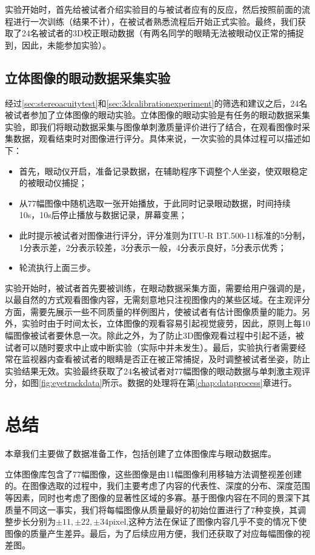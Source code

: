 实验开始时，首先给被试者介绍实验目的与被试者应有的反应，然后按照前面的流程进行一次训练（结果不计），在被试者熟悉流程后开始正式实验。最终，我们获取了24名被试者的3D校正眼动数据（有两名同学的眼睛无法被眼动仪正常的捕捉到，因此，未能参加实验）。
\subsection{立体图像的眼动数据采集实验}
\label{sec:stereoscopicimageeyetrackdatacollecting}
经过\ref{sec:stereoacuitytest}和\ref{sec:3dcalibrationexperiment}的筛选和建议之后，24名被试者参加了立体图像的眼动实验。立体图像的眼动实验是有任务的眼动数据采集实验，即我们将眼动数据采集与图像单刺激质量评价进行了结合，在观看图像时采集数据，观看结束时对图像进行评分。具体来说，一次实验的具体过程可以描述如下：
\begin{itemize}[noitemsep,topsep=0pt,parsep=0pt,partopsep=0pt]
\item 首先，眼动仪开启，准备记录数据，在辅助程序下调整个人坐姿，使双眼稳定的被眼动仪捕捉；
\item 从77幅图像中随机选取一张开始播放，于此同时记录眼动数据，时间持续10s，10s后停止播放与数据记录，屏幕变黑；
\item 此时提示被试者对图像进行评分，评分准则为ITU-R BT.500-11\parencite{recommendation2002500}标准的5分制，1分表示差，2分表示较差，3分表示一般，4分表示良好，5分表示优秀；
\item 轮流执行上面三步。
\end{itemize}

实验开始时，被试者首先要被训练，在眼动数据采集方面，需要给用户强调的是，以最自然的方式观看图像内容，无需刻意地只注视图像内的某些区域。在主观评分方面，需要先展示一些不同质量的样例图片，使被试者有估计图像质量的能力。另外，实验时由于时间太长，立体图像的观看容易引起视觉疲劳，因此，原则上每10幅图像被试者要休息一次。除此之外，为了防止3D图像观看过程中引起不适，被试者可以随时要求中止或中断实验（实际中并未发生）。最后，实验执行者需要经常在监视器内查看被试者的眼睛是否正在被正常捕捉，及时调整被试者坐姿，防止实验结果无效。实验最终获取了24名被试者对77幅图像的眼动数据与单刺激主观评分，如图\ref{fig:eyetrackdata}所示。数据的处理将在第\ref{chap:dataprocess}章进行。
\section{总结}
\label{sec:conclusionchapter3}
本章我们主要做了数据准备工作，包括创建了立体图像库与眼动数据库。

立体图像库包含了77幅图像，这些图像是由11幅图像利用移轴方法调整视差创建的。在图像选取的过程中，我们主要考虑了内容的代表性、深度的分布、深度范围等因素，同时也考虑了图像的显著性区域的多寡。基于图像内容在不同的景深下其质量不同这一事实，我们将每幅图像从质量最好的初始位置进行了7种变换，其调整步长分别为$\pm 11, \pm 22, \pm 34$pixel,这种方法在保证了图像内容几乎不变的情况下使图像的质量产生差异。最后，为了后续应用方便，我们还获取了对应每幅图像的视差图。

